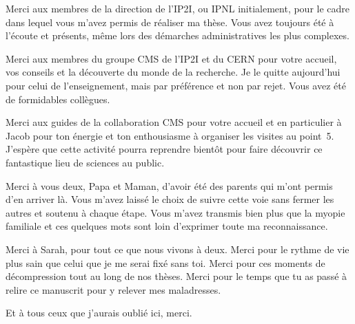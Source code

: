 \par
Merci aux membres de la direction de l'IP2I, ou IPNL initialement,
pour le cadre dans lequel vous m'avez permis de réaliser ma thèse.
Vous avez toujours été à l'écoute et présents, même lors des démarches administratives les plus complexes.
\par
Merci aux membres du groupe CMS de l'IP2I et du CERN
pour votre accueil, vos conseils et la découverte du monde de la recherche.
Je le quitte aujourd'hui pour celui de l'enseignement,
mais par préférence et non par rejet.
Vous avez été de formidables collègues.
\par
Merci aux guides de la collaboration CMS pour votre accueil
et en particulier à Jacob pour ton énergie et ton enthousiasme
à organiser les visites au point~5.
J'espère que cette activité pourra reprendre bientôt
pour faire découvrir ce fantastique lieu de sciences
au public.
\par
Merci à vous deux, Papa et Maman,
d'avoir été des parents qui m'ont permis d'en arriver là.
Vous m'avez laissé le choix de suivre cette voie sans fermer les autres
et
soutenu à chaque étape.
Vous m'avez transmis bien plus que la myopie familiale
et ces quelques mots sont loin d'exprimer toute ma reconnaissance.
\par
Merci à Sarah,
pour tout ce que nous vivons à deux.
Merci pour le rythme de vie plus sain que celui que je me serai fixé sans toi.
Merci pour ces moments de décompression tout au long de nos thèses.
Merci pour le temps que tu as passé à relire ce manuscrit pour y relever mes maladresses.
\par
Et à tous ceux que j'aurais oublié ici,
merci.
